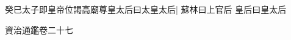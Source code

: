 癸巳太子即皇帝位謁高廟尊皇太后曰太皇太后|{
	蘇林曰上官后}
皇后曰皇太后

資治通鑑卷二十七
















































































































































